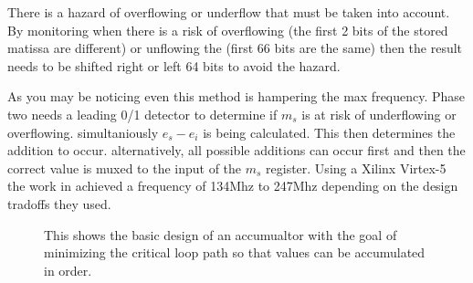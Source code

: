 There is a hazard of overflowing or underflow that must be taken into account. By monitoring when there is a risk of overflowing (the first 2 bits of the stored matissa are different) or unflowing the (first 66 bits are the same) then the result needs to be shifted right or left 64 bits to avoid the hazard.

As you may be noticing even this method is hampering the max frequency. Phase two needs a leading 0/1 detector to determine if $m_s$ is at risk of underflowing or overflowing. simultaniously $e_s - e_i$ is being calculated. This then determines the addition to occur. alternatively, all possible additions can occur first and then the correct value is muxed to the input of the $m_s$ register. Using a Xilinx Virtex-5 the work in \cite{prelim:bachir} achieved a frequency of 134Mhz to 247Mhz depending on the design tradoffs they used.

\begin{figure}
    \caption[The in-order accumulator.]{This shows the basic design of an accumualtor with the goal of minimizing the critical loop path so that values can be accumulated in order.}
    \label{fig:single_cycle_accumulator}
\end{figure}


